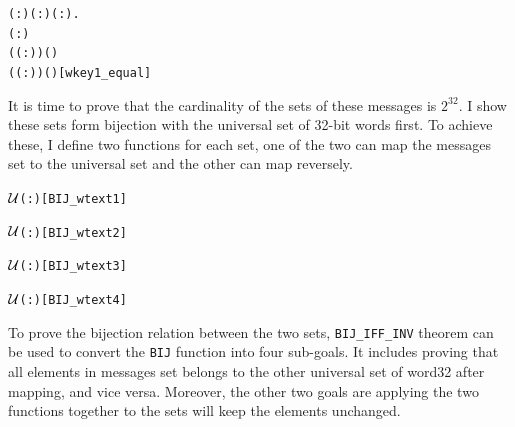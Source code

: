 \documentclass{article}
\begin{document}
\begin{alltt}
\HOLTokenTurnstile{} \HOLSymConst{\HOLTokenForall{}}( :) ( :) ( :).
        \HOLSymConst{\HOLTokenConj{}}  \HOLSymConst{\HOLTokenLeq{}} ( :) \HOLSymConst{\HOLTokenImp{}}
       (  ( :)) ( ) \HOLSymConst{=}
       (  ( :)) ( )\hfill{[wkey1_equal]}
\end{alltt}

It is time to prove that the cardinality of the sets of these messages is $2^{32}$. I show these sets form bijection with
the universal set of 32-bit words first. To achieve these, I define two functions for each set, one of the two can map the messages
set to the universal set and the other can map reversely.

\begin{alltt}
\HOLTokenTurnstile{}    \ensuremath{{\cal{U}}}(:)\hfill{[BIJ_wtext1]}
\end{alltt}

\begin{alltt}
\HOLTokenTurnstile{}    \ensuremath{{\cal{U}}}(:)\hfill{[BIJ_wtext2]}
\end{alltt}

\begin{alltt}
\HOLTokenTurnstile{}    \ensuremath{{\cal{U}}}(:)\hfill{[BIJ_wtext3]}
\end{alltt}

\begin{alltt}
\HOLTokenTurnstile{}    \ensuremath{{\cal{U}}}(:)\hfill{[BIJ_wtext4]}
\end{alltt}

To prove the bijection relation between the two sets, \verb|BIJ_IFF_INV| theorem can be used to convert the \verb|BIJ| function into
four sub-goals. It includes proving that all elements in messages set belongs to the other universal set of word32 after mapping,
and vice versa. Moreover, the other two goals are applying the two functions together to the sets will keep the elements unchanged.
\end{document}
